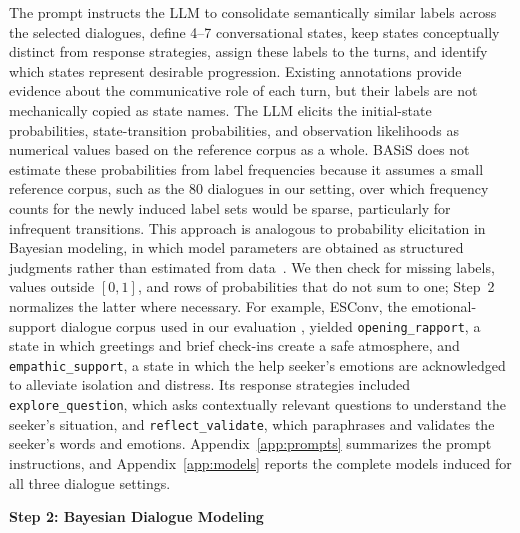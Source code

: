 \documentclass[manuscript,review,anonymous]{acmart}
\begin{document}
The prompt instructs the LLM to consolidate semantically similar labels across the selected dialogues, define 4--7 conversational states, keep states conceptually distinct from response strategies, assign these labels to the turns, and identify which states represent desirable progression. Existing annotations provide evidence about the communicative role of each turn, but their labels are not mechanically copied as state names. The LLM elicits the initial-state probabilities, state-transition probabilities, and observation likelihoods as numerical values based on the reference corpus as a whole. BASiS does not estimate these probabilities from label frequencies because it assumes a small reference corpus, such as the 80 dialogues in our setting, over which frequency counts for the newly induced label sets would be sparse, particularly for infrequent transitions. This approach is analogous to probability elicitation in Bayesian modeling, in which model parameters are obtained as structured judgments rather than estimated from data~\cite{ohagan2006uncertain,garthwaite2005statistical}. We then check for missing labels, values outside $[0,1]$, and rows of probabilities that do not sum to one; Step~2 normalizes the latter where necessary. For example, ESConv, the emotional-support dialogue corpus used in our evaluation \cite{liu2021esconv}, yielded \texttt{opening\_rapport}, a state in which greetings and brief check-ins create a safe atmosphere, and \texttt{empathic\_support}, a state in which the help seeker's emotions are acknowledged to alleviate isolation and distress. Its response strategies included \texttt{explore\_question}, which asks contextually relevant questions to understand the seeker's situation, and \texttt{reflect\_validate}, which paraphrases and validates the seeker's words and emotions. Appendix~\ref{app:prompts} summarizes the prompt instructions, and Appendix~\ref{app:models} reports the complete models induced for all three dialogue settings.

\label{mod:bayesian_modeling}
\noindent\textbf{Step 2: Bayesian Dialogue Modeling}\par
\end{document}
